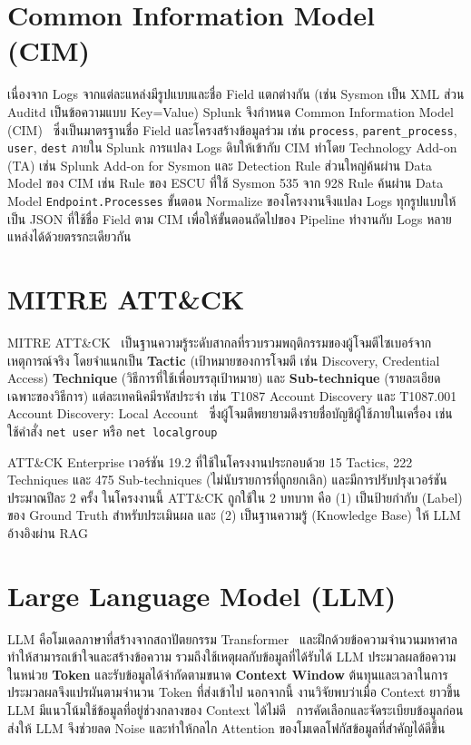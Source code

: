 \section{Common Information Model (CIM)}
เนื่องจาก Logs จากแต่ละแหล่งมีรูปแบบและชื่อ Field แตกต่างกัน
(เช่น Sysmon เป็น XML ส่วน Auditd เป็นข้อความแบบ Key=Value)
Splunk จึงกำหนด Common Information Model (CIM)~\cite{splunk-cim}
ซึ่งเป็นมาตรฐานชื่อ Field และโครงสร้างข้อมูลร่วม เช่น \texttt{process}, \texttt{parent\_process}, \texttt{user}, \texttt{dest}
ภายใน Splunk การแปลง Logs ดิบให้เข้ากับ CIM ทำโดย Technology Add-on (TA) เช่น Splunk Add-on for Sysmon
และ Detection Rule ส่วนใหญ่ค้นผ่าน Data Model ของ CIM เช่น Rule ของ ESCU ที่ใช้ Sysmon 535 จาก 928 Rule
ค้นผ่าน Data Model \texttt{Endpoint.Processes}
ขั้นตอน Normalize ของโครงงานจึงแปลง Logs ทุกรูปแบบให้เป็น JSON ที่ใช้ชื่อ Field ตาม CIM
เพื่อให้ขั้นตอนถัดไปของ Pipeline ทำงานกับ Logs หลายแหล่งได้ด้วยตรรกะเดียวกัน

\section{MITRE ATT\&CK}
MITRE ATT\&CK~\cite{mitre-attack,strom2018attack} เป็นฐานความรู้ระดับสากลที่รวบรวมพฤติกรรมของผู้โจมตีไซเบอร์จากเหตุการณ์จริง
โดยจำแนกเป็น \textbf{Tactic} (เป้าหมายของการโจมตี เช่น Discovery, Credential Access)
\textbf{Technique} (วิธีการที่ใช้เพื่อบรรลุเป้าหมาย) และ \textbf{Sub-technique} (รายละเอียดเฉพาะของวิธีการ)
แต่ละเทคนิคมีรหัสประจำ เช่น T1087 Account Discovery และ T1087.001 Account Discovery: Local Account~\cite{mitre-t1087-001}
ซึ่งผู้โจมตีพยายามดึงรายชื่อบัญชีผู้ใช้ภายในเครื่อง เช่น ใช้คำสั่ง \texttt{net user} หรือ \texttt{net localgroup}

ATT\&CK Enterprise เวอร์ชัน 19.2 ที่ใช้ในโครงงานประกอบด้วย 15 Tactics, 222 Techniques
และ 475 Sub-techniques (ไม่นับรายการที่ถูกยกเลิก) และมีการปรับปรุงเวอร์ชันประมาณปีละ 2 ครั้ง
ในโครงงานนี้ ATT\&CK ถูกใช้ใน 2 บทบาท คือ (1) เป็นป้ายกำกับ (Label) ของ Ground Truth สำหรับประเมินผล
และ (2) เป็นฐานความรู้ (Knowledge Base) ให้ LLM อ้างอิงผ่าน RAG

\section{Large Language Model (LLM)}
LLM คือโมเดลภาษาที่สร้างจากสถาปัตยกรรม Transformer~\cite{vaswani2017attention}
และฝึกด้วยข้อความจำนวนมหาศาล ทำให้สามารถเข้าใจและสร้างข้อความ รวมถึงใช้เหตุผลกับข้อมูลที่ได้รับได้
LLM ประมวลผลข้อความในหน่วย \textbf{Token} และรับข้อมูลได้จำกัดตามขนาด \textbf{Context Window}
ต้นทุนและเวลาในการประมวลผลจึงแปรผันตามจำนวน Token ที่ส่งเข้าไป
นอกจากนี้ งานวิจัยพบว่าเมื่อ Context ยาวขึ้น LLM มีแนวโน้มใช้ข้อมูลที่อยู่ช่วงกลางของ Context ได้ไม่ดี~\cite{liu2024lost}
การคัดเลือกและจัดระเบียบข้อมูลก่อนส่งให้ LLM จึงช่วยลด Noise และทำให้กลไก Attention ของโมเดลโฟกัสข้อมูลที่สำคัญได้ดีขึ้น

